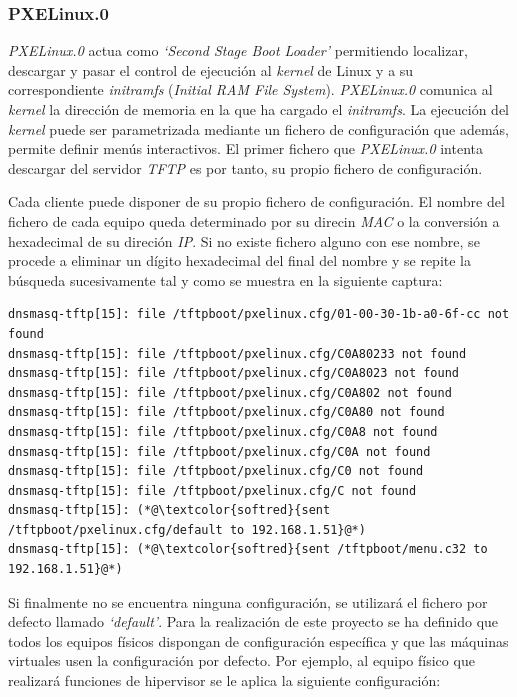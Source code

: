 \documentclass[a4paper,12pt,spanish,final]{epsc_tfc_pfc}
\begin{document}
\subsubsection{PXELinux.0}
\emph{PXELinux.0} actua como \emph{`Second Stage Boot Loader'} permitiendo localizar, descargar y pasar el control de ejecución al \emph{kernel} de Linux y a su correspondiente \emph{initramfs} (\emph{Initial RAM File System}). \emph{PXELinux.0} comunica al \emph{kernel} la dirección de memoria en la que ha cargado el \emph{initramfs}. La ejecución del \emph{kernel} puede ser parametrizada mediante un fichero de configuración que además, permite definir menús interactivos. El primer fichero que \emph{PXELinux.0} intenta descargar del servidor \emph{TFTP} es por tanto, su propio fichero de configuración.

Cada cliente puede disponer de su propio fichero de configuración. El nombre del fichero de cada equipo queda determinado por su direcin \emph{MAC} o la conversión a hexadecimal de su direción \emph{IP}. Si no existe fichero alguno con ese nombre, se procede a eliminar un dígito hexadecimal del final del nombre y se repite la búsqueda sucesivamente tal y como se muestra en la siguiente captura:\\

\begin{lstlisting}[style=dnsmasq]
dnsmasq-tftp[15]: file /tftpboot/pxelinux.cfg/01-00-30-1b-a0-6f-cc not found
dnsmasq-tftp[15]: file /tftpboot/pxelinux.cfg/C0A80233 not found
dnsmasq-tftp[15]: file /tftpboot/pxelinux.cfg/C0A8023 not found
dnsmasq-tftp[15]: file /tftpboot/pxelinux.cfg/C0A802 not found
dnsmasq-tftp[15]: file /tftpboot/pxelinux.cfg/C0A80 not found
dnsmasq-tftp[15]: file /tftpboot/pxelinux.cfg/C0A8 not found
dnsmasq-tftp[15]: file /tftpboot/pxelinux.cfg/C0A not found
dnsmasq-tftp[15]: file /tftpboot/pxelinux.cfg/C0 not found
dnsmasq-tftp[15]: file /tftpboot/pxelinux.cfg/C not found
dnsmasq-tftp[15]: (*@\textcolor{softred}{sent /tftpboot/pxelinux.cfg/default to 192.168.1.51}@*)
dnsmasq-tftp[15]: (*@\textcolor{softred}{sent /tftpboot/menu.c32 to 192.168.1.51}@*)
\end{lstlisting}

Si finalmente no se encuentra ninguna configuración, se utilizará el fichero por defecto llamado \emph{`default'}. Para la realización de este proyecto se ha definido que todos los equipos físicos dispongan de configuración específica y que las máquinas virtuales usen la configuración por defecto. Por ejemplo, al equipo físico que realizará funciones de hipervisor se le aplica la siguiente configuración:\\
\end{document}
